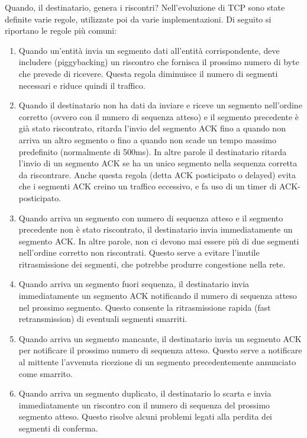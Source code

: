 Quando, il destinatario, genera i riscontri? Nell'evoluzione di TCP sono state definite varie regole, utilizzate poi da varie implementazioni. Di seguito si riportano le regole più comuni:
\begin{enumerate}
    \item Quando un'entità invia un segmento dati all'entità corrispondente, deve includere (piggybacking) un riscontro che fornisca il prossimo numero di byte che prevede di ricevere. Questa regola diminuisce il numero di segmenti necessari e riduce quindi il traffico.
    \item Quando il destinatario non ha dati da inviare e riceve un segmento nell'ordine corretto (ovvero con il numero di sequenza atteso) e il segmento precedente è già stato riscontrato, ritarda l'invio del segmento ACK fino a quando non arriva un altro segmento o fino a quando non scade un tempo massimo predefinito (normalmente di 500ms). In altre parole il destinatario ritarda l'invio di un segmento ACK se ha un unico segmento nella sequenza corretta da riscontrare. Anche questa regola (detta ACK posticipato o delayed) evita che i segmenti ACK creino un traffico eccessivo, e fa uso di un timer di ACK-posticipato.
    \item Quando arriva un segmento con numero di sequenza atteso e il segmento precedente non è stato riscontrato, il destinatario invia immediatamente un segmento ACK. In altre parole, non ci devono mai essere più di due segmenti nell'ordine corretto non riscontrati. Questo serve a evitare l'inutile ritrasmissione dei segmenti, che potrebbe produrre congestione nella rete.
    \item Quando arriva un segmento fuori sequenza, il destinatario invia immediatamente un segmento ACK notificando il numero di sequenza atteso nel prossimo segmento. Questo consente la ritrasmissione rapida (fast retransmission) di eventuali segmenti smarriti.
    \item Quando arriva un segmento mancante, il destinatario invia un segmento ACK per notificare il prossimo numero di sequenza atteso. Questo serve a notificare al mittente l'avvenuta ricezione di un segmento precedentemente annunciato come smarrito.
    \item Quando arriva un segmento duplicato, il destinatario lo scarta e invia immediatamente un riscontro con il numero di sequenza del prossimo segmento atteso. Questo risolve alcuni problemi legati alla perdita dei segmenti di conferma.
\end{enumerate}

